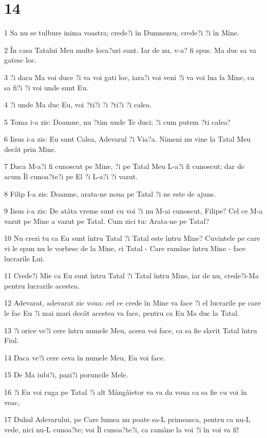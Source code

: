 \chapter{14}

\par 1 Sa nu se tulbure inima voastra; crede?i în Dumnezeu, crede?i ?i în Mine.
\par 2 În casa Tatalui Meu multe loca?uri sunt. Iar de nu, v-a? fi spus. Ma duc sa va gatesc loc.
\par 3 ?i daca Ma voi duce ?i va voi gati loc, iara?i voi veni ?i va voi lua la Mine, ca sa fi?i ?i voi unde sunt Eu.
\par 4 ?i unde Ma duc Eu, voi ?ti?i ?i ?ti?i ?i calea.
\par 5 Toma i-a zis: Doamne, nu ?tim unde Te duci; ?i cum putem ?ti calea?
\par 6 Iisus i-a zis: Eu sunt Calea, Adevarul ?i Via?a. Nimeni nu vine la Tatal Meu decât prin Mine.
\par 7 Daca M-a?i fi cunoscut pe Mine, ?i pe Tatal Meu L-a?i fi cunoscut; dar de acum Îl cunoa?te?i pe El ?i L-a?i ?i vazut.
\par 8 Filip I-a zis: Doamne, arata-ne noua pe Tatal ?i ne este de ajuns.
\par 9 Iisus i-a zis: De atâta vreme sunt cu voi ?i nu M-ai cunoscut, Filipe? Cel ce M-a vazut pe Mine a vazut pe Tatal. Cum zici tu: Arata-ne pe Tatal?
\par 10 Nu crezi tu ca Eu sunt întru Tatal ?i Tatal este întru Mine? Cuvintele pe care vi le spun nu le vorbesc de la Mine, ci Tatal - Care ramâne întru Mine - face lucrarile Lui.
\par 11 Crede?i Mie ca Eu sunt întru Tatal ?i Tatal întru Mine, iar de nu, crede?i-Ma pentru lucrarile acestea.
\par 12 Adevarat, adevarat zic voua: cel ce crede în Mine va face ?i el lucrarile pe care le fac Eu ?i mai mari decât acestea va face, pentru ca Eu Ma duc la Tatal.
\par 13 ?i orice ve?i cere întru numele Meu, aceea voi face, ca sa fie slavit Tatal întru Fiul.
\par 14 Daca ve?i cere ceva în numele Meu, Eu voi face.
\par 15 De Ma iubi?i, pazi?i poruncile Mele.
\par 16 ?i Eu voi ruga pe Tatal ?i alt Mângâietor va va da voua ca sa fie cu voi în veac,
\par 17 Duhul Adevarului, pe Care lumea nu poate sa-L primeasca, pentru ca nu-L vede, nici nu-L cunoa?te; voi Îl cunoa?te?i, ca ramâne la voi ?i în voi va fi!
